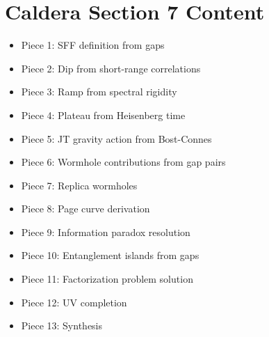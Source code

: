 \documentclass[11pt,a4paper]{article}
\begin{document}
\section{Caldera Section 7 Content}

\begin{itemize}
    \item Piece 1: SFF definition from gaps
    \item Piece 2: Dip from short-range correlations
    \item Piece 3: Ramp from spectral rigidity
    \item Piece 4: Plateau from Heisenberg time
    \item Piece 5: JT gravity action from Bost-Connes
    \item Piece 6: Wormhole contributions from gap pairs
    \item Piece 7: Replica wormholes
    \item Piece 8: Page curve derivation
    \item Piece 9: Information paradox resolution
    \item Piece 10: Entanglement islands from gaps
    \item Piece 11: Factorization problem solution
    \item Piece 12: UV completion
    \item Piece 13: Synthesis
\end{itemize}
\end{document}
